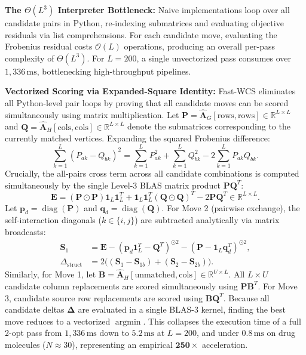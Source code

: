 \documentclass[conference]{IEEEtran}
\begin{document}
\noindent\textbf{The $\Theta(L^3)$ Interpreter Bottleneck:} Naive implementations loop over all candidate pairs in Python, re-indexing submatrices and evaluating objective residuals via list comprehensions. For each candidate move, evaluating the Frobenius residual costs $\mathcal{O}(L)$ operations, producing an overall per-pass complexity of $\Theta(L^3)$. For $L = 200$, a single unvectorized pass consumes over $1,336\,\text{ms}$, bottlenecking high-throughput pipelines.

\noindent\textbf{Vectorized Scoring via Expanded-Square Identity:} Fast-WCS eliminates all Python-level pair loops by proving that all candidate moves can be scored simultaneously using matrix multiplication. Let $\mathbf{P} = \hat{\mathbf{A}}_G[\text{rows}, \text{rows}] \in \mathbb{R}^{L \times L}$ and $\mathbf{Q} = \hat{\mathbf{A}}_H[\text{cols}, \text{cols}] \in \mathbb{R}^{L \times L}$ denote the submatrices corresponding to the currently matched vertices. Expanding the squared Frobenius difference:
\begin{equation}
\sum_{k=1}^L (P_{ak} - Q_{bk})^2 = \sum_{k=1}^L P_{ak}^2 + \sum_{k=1}^L Q_{bk}^2 - 2 \sum_{k=1}^L P_{ak} Q_{bk}.
\end{equation}
Crucially, the all-pairs cross term across all candidate combinations is computed simultaneously by the single Level-3 BLAS matrix product $\mathbf{P}\mathbf{Q}^T$:
\begin{equation}
\mathbf{E} = (\mathbf{P} \odot \mathbf{P})\mathbf{1}_L \mathbf{1}_L^T + \mathbf{1}_L \mathbf{1}_L^T (\mathbf{Q} \odot \mathbf{Q})^T - 2 \mathbf{P}\mathbf{Q}^T \in \mathbb{R}^{L \times L}.
\end{equation}
Let $\mathbf{p}_d = \operatorname{diag}(\mathbf{P})$ and $\mathbf{q}_d = \operatorname{diag}(\mathbf{Q})$. For Move 2 (pairwise exchange), the self-interaction diagonals ($k \in \{i, j\}$) are subtracted analytically via matrix broadcasts:
\begin{align}
\mathbf{S}_1 &= \mathbf{E} - (\mathbf{p}_d\mathbf{1}_L^T - \mathbf{Q}^T)^{\odot 2} - (\mathbf{P} - \mathbf{1}_L\mathbf{q}_d^T)^{\odot 2}, \\
\Delta_{\text{struct}} &= 2\big( (\mathbf{S}_1 - \mathbf{S}_{1b}) + (\mathbf{S}_2 - \mathbf{S}_{2b}) \big).
\end{align}
Similarly, for Move 1, let $\mathbf{B} = \hat{\mathbf{A}}_H[\text{unmatched}, \text{cols}] \in \mathbb{R}^{U \times L}$. All $L \times U$ candidate column replacements are scored simultaneously using $\mathbf{P}\mathbf{B}^T$. For Move 3, candidate source row replacements are scored using $\mathbf{B}\mathbf{Q}^T$.
Because all candidate deltas $\mathbf{\Delta}$ are evaluated in a single BLAS-3 kernel, finding the best move reduces to a vectorized $\operatorname{argmin}$. This collapses the execution time of a full 2-opt pass from $1,336\,\text{ms}$ down to $5.2\,\text{ms}$ at $L=200$, and under $0.8\,\text{ms}$ on drug molecules ($N \approx 30$), representing an empirical $\mathbf{250\times}$ acceleration.
\end{document}
